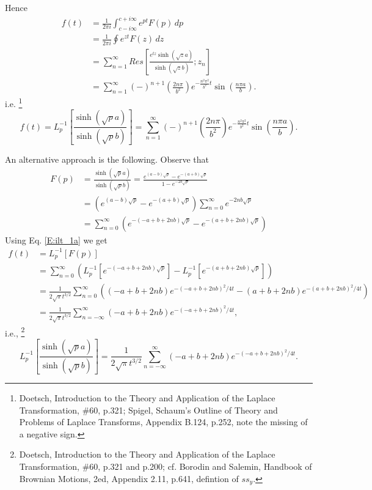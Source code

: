 Hence
\begin{align*}
	f(t)  
	&= \frac{1}{2\pi i}   
      \int_{c-i\infty}^{c+i\infty} e^{p t} F(p)\, dp  \\
	&= \frac{1}{2\pi i} \oint e^{z t} F(z)\, dz \\
	&= \sum_{n=1}^{\infty} 
	  Res\left[ \frac{e^{tz} \sinh (\sqrt{z} a)}{\sinh (\sqrt{z} b)}; z_n
		\right] \\
	&= \sum_{n=1}^{\infty} 
	  (-)^{n+1} \left( \frac{2n\pi}{b^2} \right) e^{-\frac{n^2\pi^2}{b^2} t} 
	  \sin(\frac{n\pi a}{b}).
\end{align*}
i.e.
\footnote{Doetsch, Introduction to the Theory and Application of the Laplace
Transformation, \#60, p.321; Spigel, Schaum's Outline of Theory and Problems of
Laplace Transforms, Appendix B.124, p.252, note the missing of a negative sign.}
\begin{equation} \label{E:ilt_sinh_1A}
  f(t)
	= L_p^{-1}\left[ \frac{\sinh (\sqrt{p} a)}{\sinh (\sqrt{p} b)} \right]
	= \sum_{n=1}^{\infty} 
	  (-)^{n+1} \left( \frac{2n\pi}{b^2} \right) e^{-\frac{n^2\pi^2}{b^2} t} 
	  \sin(\frac{n\pi a}{b}).
\end{equation}

An alternative approach is the following. Observe that
\begin{align*}
	F(p) 
	&= \frac{\sinh (\sqrt{p} a)}{\sinh (\sqrt{p} b)}  
	 = \frac{e^{(a-b)\sqrt{p}} - e^{-(a+b)\sqrt{p}}}{1- e^{-2b\sqrt{p}}} \\
	&= (e^{(a-b)\sqrt{p}} - e^{-(a+b)\sqrt{p}}) 
	   \sum_{n=0}^{\infty} e^{-2nb\sqrt{p}} \\
  &= \sum_{n=0}^{\infty} 
		 \left( e^{-(-a+b+2nb)\sqrt{p}} - e^{-(a+b+2nb)\sqrt{p}} \right)
\end{align*}
Using Eq. \ref{E:ilt_1a} we get
\begin{align*}
	f(t) 
	&= L_p^{-1} [F(p)]  \\
  &= \sum_{n=0}^{\infty} 
	   \left( L_p^{-1}[ e^{-(-a+b+2nb)\sqrt{p}} ] 
	        - L_p^{-1}[ e^{-( a+b+2nb)\sqrt{p}} ] \right) \\
	&= \frac{1}{2\sqrt{\pi} t^{{3/2}} }
 		 \sum_{n=0}^{\infty} 
		 \left(
			 (-a+b+2nb) e^{-(-a+b+2nb)^2/4t} - (a+b+2nb) e^{-(a+b+2nb)^2/4t}
		 \right)  \\
  &= \frac{1}{2\sqrt{\pi} t^{{3/2}} }
 		 \sum_{n=-\infty}^{\infty}  (-a+b+2nb) e^{-(-a+b+2nb)^2/4t},
\end{align*}
i.e.,
\footnote{Doetsch, Introduction to the Theory and Application of the Laplace
Transformation, \#60, p.321 and p.200; cf. Borodin and Salemin, Handbook of 
Brownian Motions, 2ed, Appendix 2.11, p.641, defintion of $ss_y$.}
\begin{equation} \label{E:ilt_sinh_1B}
	L_p^{-1}\left[ \frac{\sinh (\sqrt{p} a)}{\sinh (\sqrt{p} b)} \right]
  = \frac{1}{2\sqrt{\pi} t^{{3/2}} }
 		\sum_{n=-\infty}^{\infty}  (-a+b+2nb) e^{-(-a+b+2nb)^2/4t}.
\end{equation}

